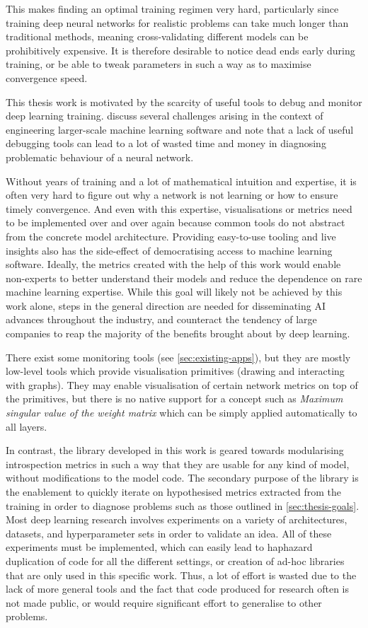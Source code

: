 This makes finding an optimal training regimen very hard, particularly since
training deep neural networks for realistic problems can take much longer than
traditional methods, meaning cross-validating different models can be
prohibitively expensive. It is therefore desirable to notice dead ends early
during training, or be able to tweak parameters in such a way as to maximise
convergence speed.

This thesis work is motivated by the scarcity of useful tools to debug and
monitor deep learning training. \citet{arpteg2018software} discuss several
challenges arising in the context of engineering larger-scale machine learning
software and note that a lack of useful debugging tools can lead to a lot of
wasted time and money in diagnosing problematic behaviour of a neural network.

Without years of training and a lot of
mathematical intuition and expertise, it is often very hard to figure out why a
network is not learning or how to ensure timely convergence.  And even with this
expertise, visualisations or metrics need to be implemented over and over again
because common tools do not abstract from the concrete model architecture.
Providing easy-to-use tooling and live insights also has the side-effect of
democratising access to machine learning software. Ideally, the metrics created
with the help of this work would enable non-experts to better understand their
models and reduce the dependence on rare machine learning expertise. While this
goal will likely not be achieved by this work alone, steps in the general
direction are needed for disseminating AI advances throughout the industry, and
counteract the tendency of large companies to reap the majority of the benefits
brought about by deep learning.

There exist some monitoring tools (see \cref{sec:existing-apps}), but they
are mostly low-level tools which provide visualisation primitives (drawing and
interacting with graphs). They may enable visualisation of certain network
metrics on top of the primitives, but there is no native support for a concept
such as \emph{Maximum singular value of the weight matrix} which can be simply
applied automatically to all layers.

In contrast, the library developed in this work is geared towards modularising
introspection metrics in such a way that they are usable for any kind of model,
without modifications to the model code. The secondary purpose of the library is
the enablement to quickly iterate on hypothesised metrics extracted from the
training in order to diagnose problems such as those outlined in
\cref{sec:thesis-goals}. Most deep learning research involves experiments on a
variety of architectures, datasets, and hyperparameter sets in order to validate
an idea. All of these experiments must be implemented, which can easily lead to
haphazard duplication of code for all the different settings, or creation of
ad-hoc libraries that are only used in this specific work. Thus, a lot of effort
is wasted due to the lack of more general tools and the fact that code produced
for research often is not made public, or would require significant effort to
generalise to other problems.

